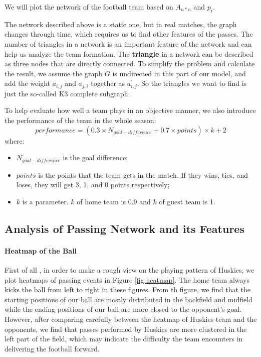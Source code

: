\documentclass[12pt]{mcmthesis}
\begin{document}
We will plot the network of the football team based on $A_{n*n}$ and $p_{i}$.

The network described above is a static one, but in real matches, the graph changes through time, which requires us to find other features of the passes. The number of triangles in a network is an important feature of the network and can help us analyze the team formation. The \textbf{triangle} in a network can be described as three nodes that are directly connected. To simplify the problem and calculate the result, we assume the graph $G$ is undirected in this part of our model, and add the weight $a_{i, j}$ and $a_{j, i}$ together as $a^{'}_{i, j}$. So the triangles we want to find is just the so-called K3 complete subgraph.~\cite{defining}

To help evaluate how well a team plays in an objective manner, we also introduce the performance of the team in the whole season:
\begin{equation}\label{eq:perform}
performance = \left(0.3 \times N_{goal-difference} + 0.7 \times points \right) \times k + 2
\end{equation}
where:
\begin{itemize}
	\item $N_{goal-difference}$ is the goal difference;
	\item $points$ is the points that the team gets in the match. If they wins, ties, and loses, they will get 3, 1, and 0 points respectively;
	\item $k$ is a parameter. $k$ of home team is 0.9 and $k$ of guest team is 1.
\end{itemize}

\subsection{Analysis of Passing Network and its Features}
\paragraph{Heatmap of the Ball}
First of all , in order to make a rough view on the playing pattern of Huskies, we plot heatmaps of passing events in Figure \ref{fig:heatmap}. The home team always kicks the ball from left to right in these figures. From th figure, we find that the starting positions of our ball are mostly distributed in the backfield and midfield while the ending positions of our ball are more closed to the opponent's goal. However, after comparing carefully between the heatmap of Huskies team and the opponents, we find that passes performed by Huskies are more clustered in the left part of the field, which may indicate the difficulty the team encounters in delivering the football forward.
\end{document}
